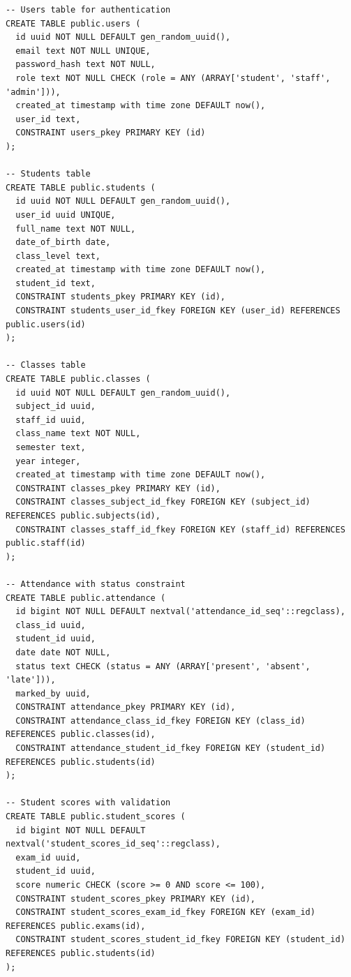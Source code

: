 \documentclass[12pt,a4paper]{article}
\begin{document}
\begin{verbatim}
-- Users table for authentication
CREATE TABLE public.users (
  id uuid NOT NULL DEFAULT gen_random_uuid(),
  email text NOT NULL UNIQUE,
  password_hash text NOT NULL,
  role text NOT NULL CHECK (role = ANY (ARRAY['student', 'staff', 'admin'])),
  created_at timestamp with time zone DEFAULT now(),
  user_id text,
  CONSTRAINT users_pkey PRIMARY KEY (id)
);

-- Students table
CREATE TABLE public.students (
  id uuid NOT NULL DEFAULT gen_random_uuid(),
  user_id uuid UNIQUE,
  full_name text NOT NULL,
  date_of_birth date,
  class_level text,
  created_at timestamp with time zone DEFAULT now(),
  student_id text,
  CONSTRAINT students_pkey PRIMARY KEY (id),
  CONSTRAINT students_user_id_fkey FOREIGN KEY (user_id) REFERENCES public.users(id)
);

-- Classes table
CREATE TABLE public.classes (
  id uuid NOT NULL DEFAULT gen_random_uuid(),
  subject_id uuid,
  staff_id uuid,
  class_name text NOT NULL,
  semester text,
  year integer,
  created_at timestamp with time zone DEFAULT now(),
  CONSTRAINT classes_pkey PRIMARY KEY (id),
  CONSTRAINT classes_subject_id_fkey FOREIGN KEY (subject_id) REFERENCES public.subjects(id),
  CONSTRAINT classes_staff_id_fkey FOREIGN KEY (staff_id) REFERENCES public.staff(id)
);

-- Attendance with status constraint
CREATE TABLE public.attendance (
  id bigint NOT NULL DEFAULT nextval('attendance_id_seq'::regclass),
  class_id uuid,
  student_id uuid,
  date date NOT NULL,
  status text CHECK (status = ANY (ARRAY['present', 'absent', 'late'])),
  marked_by uuid,
  CONSTRAINT attendance_pkey PRIMARY KEY (id),
  CONSTRAINT attendance_class_id_fkey FOREIGN KEY (class_id) REFERENCES public.classes(id),
  CONSTRAINT attendance_student_id_fkey FOREIGN KEY (student_id) REFERENCES public.students(id)
);

-- Student scores with validation
CREATE TABLE public.student_scores (
  id bigint NOT NULL DEFAULT nextval('student_scores_id_seq'::regclass),
  exam_id uuid,
  student_id uuid,
  score numeric CHECK (score >= 0 AND score <= 100),
  CONSTRAINT student_scores_pkey PRIMARY KEY (id),
  CONSTRAINT student_scores_exam_id_fkey FOREIGN KEY (exam_id) REFERENCES public.exams(id),
  CONSTRAINT student_scores_student_id_fkey FOREIGN KEY (student_id) REFERENCES public.students(id)
);
\end{verbatim}

\end{document}
